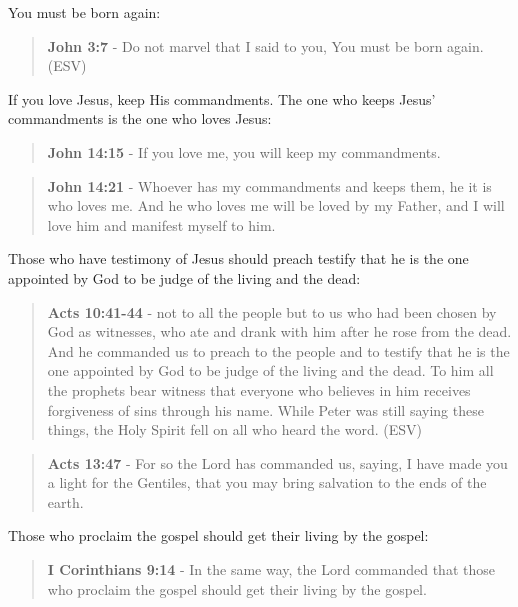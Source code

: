 \documentclass[11pt]{article}
\begin{document}
You must be born again:

\begin{quote}
\textbf{John 3:7} - Do not marvel that I said to you, You must be born again. (ESV)
\end{quote}

If you love Jesus, keep His commandments. The one who keeps Jesus' commandments is the one who loves Jesus:

\begin{quote}
\textbf{John 14:15} - If you love me, you will keep my commandments.
\end{quote}

\begin{quote}
\textbf{John 14:21} - Whoever has my commandments and keeps them, he it is who loves me. And he who loves me will be loved by my Father, and I will love him and manifest myself to him.
\end{quote}

Those who have testimony of Jesus should preach testify that he is the one appointed by God to be judge of the living and the dead:

\begin{quote}
\textbf{Acts 10:41-44} - not to all the people but to us who had been chosen by God as witnesses, who ate and drank with him after he rose from the dead. And he commanded us to preach to the people and to testify that he is the one appointed by God to be judge of the living and the dead. To him all the prophets bear witness that everyone who believes in him receives forgiveness of sins through his name. While Peter was still saying these things, the Holy Spirit fell on all who heard the word. (ESV)
\end{quote}

\begin{quote}
\textbf{Acts 13:47} - For so the Lord has commanded us, saying, I have made you a light for the Gentiles, that you may bring salvation to the ends of the earth.
\end{quote}

Those who proclaim the gospel should get their living by the gospel:

\begin{quote}
\textbf{I Corinthians 9:14} - In the same way, the Lord commanded that those who proclaim the gospel should get their living by the gospel.
\end{quote}
\end{document}
